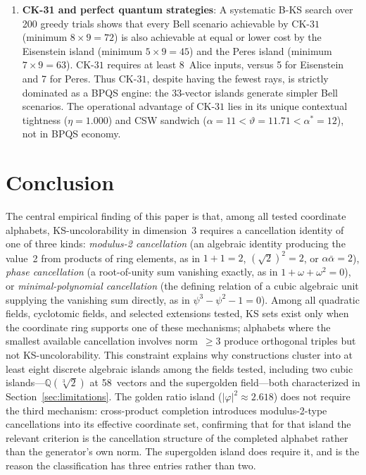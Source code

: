 \documentclass[12pt,a4paper]{article}
\newcommand{\Q}{\mathbb{Q}}
\newcommand{\CK}{\mathrm{CK}\text{-}31}
\begin{document}
\begin{enumerate}
    \item \textbf{CK-31 and perfect quantum strategies}: A systematic B-KS search over 200 greedy trials shows that every Bell scenario achievable by $\CK$ (minimum $8 \times 9 = 72$) is also achievable at equal or lower cost by the Eisenstein island (minimum $5 \times 9 = 45$) and the Peres island (minimum $7 \times 9 = 63$).  $\CK$ requires at least 8~Alice inputs, versus 5 for Eisenstein and 7 for Peres.  Thus $\CK$, despite having the fewest rays, is strictly dominated as a BPQS engine: the 33-vector islands generate simpler Bell scenarios. The operational advantage of $\CK$ lies in its unique contextual tightness ($\eta = 1.000$) and CSW sandwich ($\alpha = 11 < \vartheta = 11.71 < \alpha^* = 12$), not in BPQS economy.
\end{enumerate}

\section{Conclusion}\label{sec:conclusion}

The central empirical finding of this paper is that, among all tested coordinate alphabets, KS-uncolorability in dimension~3 requires a cancellation identity of one of three kinds: \emph{modulus-2 cancellation} (an algebraic identity producing the value~2 from products of ring elements, as in $1+1=2$, $(\sqrt{2})^2=2$, or $\alpha\bar\alpha=2$), \emph{phase cancellation} (a root-of-unity sum vanishing exactly, as in $1+\omega+\omega^2=0$), or \emph{minimal-polynomial cancellation} (the defining relation of a cubic algebraic unit supplying the vanishing sum directly, as in $\psi^3 - \psi^2 - 1 = 0$).  Among all quadratic fields, cyclotomic fields, and selected extensions tested, KS sets exist only when the coordinate ring supports one of these mechanisms; alphabets where the smallest available cancellation involves norm~$\geq 3$ produce orthogonal triples but not KS-uncolorability.  This constraint explains why constructions cluster into at least eight discrete algebraic islands among the fields tested, including two cubic islands---$\Q(\sqrt[3]{2})$ at 58~vectors and the supergolden field---both characterized in Section~\ref{sec:limitations}.  The golden ratio island ($|\varphi|^2 \approx 2.618$) does not require the third mechanism: cross-product completion introduces modulus-2-type cancellations into its effective coordinate set, confirming that for that island the relevant criterion is the cancellation structure of the completed alphabet rather than the generator's own norm.  The supergolden island does require it, and is the reason the classification has three entries rather than two.
\end{document}
